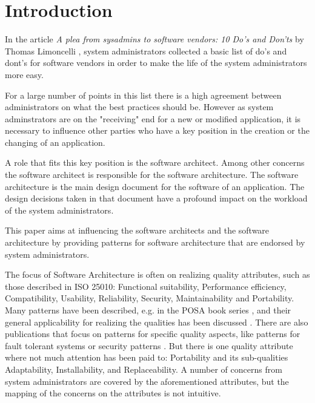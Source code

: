 \section{Introduction} 

In the article \textit{A plea from sysadmins to software vendors: 10 Do's and Don'ts} by Thomas Limoncelli \cite{Limoncelli2011a}, system administrators collected a basic list of do's and dont's for software vendors in order to make the life of the system administrators more easy. 

For a large number of points in this list there is a high agreement between administrators on what the best practices should be. However as system adminstrators are on the "receiving" end for a new or modified application, it is necessary to influence other parties who have a key position in the creation or the changing of an application. 

A role that fits this key position is the software architect. Among other concerns the software architect is responsible for the software architecture. The software architecture is the main design document for the software of an application. The design decisions taken in that document have a profound impact on the workload of the system administrators. 

This paper aims at influencing the software architects and the software architecture by providing patterns for software architecture that are endorsed by system administrators.

The focus of Software Architecture is often on realizing quality attributes, such as those described in ISO 25010: Functional suitability, Performance efficiency, Compatibility, Usability, Reliability, Security, Maintainability and Portability. Many patterns have been described, e.g. in the POSA book series \cite{Buschmann1996}, and their general applicability for realizing the qualities has been discussed \cite{Harrison2011}. There are also publications that focus on patterns for specific quality aspects, like patterns for fault tolerant systems \cite{Hanmer2007} or security patterns \cite{Schumacher2005}. But there is one quality attribute where not much attention has been paid to: Portability and its sub-qualities Adaptability, Installability, and Replaceability. A number of concerns from system administrators are covered by the aforementioned attributes, but the mapping of the concerns on the attributes is not intuitive.

